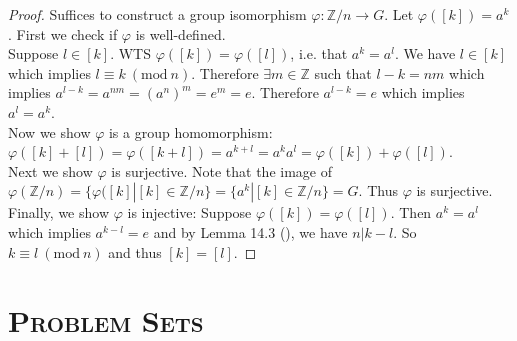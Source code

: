 \documentclass{article}
\newcommand{\Z}{\mathbb{Z}}
\newcommand{\func}[3]{#1: #2 \to #3}
\renewcommand{\mod}[1]{\ (\mathrm{mod}\ #1)}
\theoremstyle{definition}
\theoremstyle{remark}
\begin{document}
{        \begin{proof}
            Suffices to construct a group isomorphism $\func{\varphi}{\Z/n}{G}$. Let $\varphi([k])=a^k$. First we check if $\varphi$ is well-defined.\\
            Suppose $l\in [k]$. WTS $\varphi([k])=\varphi([l])$, i.e. that $a^k=a^l$. We have $l \in [k]$ which implies $l\equiv k\mod n$. Therefore $\exists m \in \Z$ such that $l-k=nm$ which implies $a^{l-k}=a^{nm}=(a^n)^m=e^m=e$. Therefore $a^{l-k}=e$ which implies $a^l=a^k$.\\
            Now we show $\varphi$ is a group homomorphism: $\varphi([k]+[l])=\varphi([k+l])=a^{k+l}=a^ka^l=\varphi([k])+\varphi([l])$.\\
            Next we show $\varphi$ is surjective. Note that the image of $\varphi(\Z/n)=\{\varphi([k]|[k] \in \Z/n\}=\{a^k|[k] \in \Z/n\}=G$. Thus $\varphi$ is surjective.\\
            Finally, we show $\varphi$ is injective: Suppose $\varphi([k])=\varphi([l])$. Then $a^k=a^l$ which implies $a^{k-l}=e$ and by Lemma 14.3 (), we have $n|k-l$. So $k\equiv l\mod n$ and thus $[k]=[l]$.
        \end{proof}
    }
    \noindent\section*{\textbf{\textsc{Problem Sets}}}{
    
    }
\end{document}
